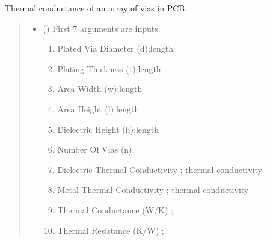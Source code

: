 \documentclass[letterpaper,10pt,english]{sphinxmanual}
\begin{document}

\begin{fulllineitems}
\label{\detokenize{components:components.thermal_conductance_of_via_farm}}
\pysigstartsignatures
{}
\pysigstopsignatures
\sphinxAtStartPar
Thermal conductance of an array of vias in PCB.
\begin{quote}\begin{description}
\begin{itemize}
\item {} 
\sphinxAtStartPar
{} () \textendash{} 
\sphinxAtStartPar
First 7 arguments are inputs.
\begin{enumerate}
%
\item {} 
\sphinxAtStartPar
Plated Via Diameter (d);length

\item {} 
\sphinxAtStartPar
Plating Thickness (t);length

\item {} 
\sphinxAtStartPar
Area Width (w);length

\item {} 
\sphinxAtStartPar
Area Height (l);length

\item {} 
\sphinxAtStartPar
Dielectric Height (h);length

\item {} 
\sphinxAtStartPar
Number Of Vias (n);

\item {} 
\sphinxAtStartPar
Dielectric Thermal Conductivity ;   thermal conductivity

\item {} 
\sphinxAtStartPar
Metal Thermal Conductivity ; thermal conductivity

\item {} 
\sphinxAtStartPar
Thermal Conductance (W/K) ;

\item {} 
\sphinxAtStartPar
Thermal Resistance (K/W) ;

\end{enumerate}



\end{itemize}
\end{description}
\end{quote}
\end{fulllineitems}
\end{document}
